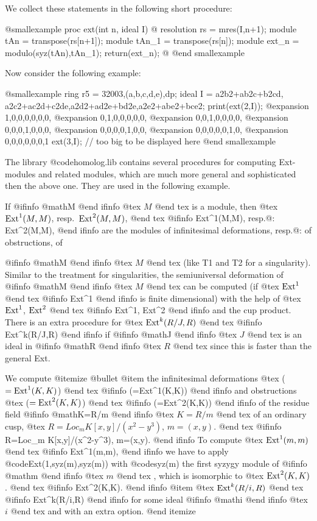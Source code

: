 We collect these statements in the following short procedure:

@smallexample
proc ext(int n, ideal I)
@{
  resolution rs = mres(I,n+1);
  module tAn    = transpose(rs[n+1]);
  module tAn_1  = transpose(rs[n]);
  module ext_n  = modulo(syz(tAn),tAn_1);
  return(ext_n);
@}
@end smallexample

Now consider the following example:

@smallexample
ring r5 = 32003,(a,b,c,d,e),dp;
ideal I = a2b2+ab2c+b2cd, a2c2+ac2d+c2de,a2d2+ad2e+bd2e,a2e2+abe2+bce2;
print(ext(2,I));
@expansion{} 1,0,0,0,0,0,0,
@expansion{} 0,1,0,0,0,0,0,
@expansion{} 0,0,1,0,0,0,0,
@expansion{} 0,0,0,1,0,0,0,
@expansion{} 0,0,0,0,1,0,0,
@expansion{} 0,0,0,0,0,1,0,
@expansion{} 0,0,0,0,0,0,1
ext(3,I);   // too big to be displayed here
@end smallexample

The library @code{homolog.lib} contains several procedures for computing
Ext-modules and related modules, which are much more general and
sophisticated then the above one. They are used in the following
example.

If 
@ifinfo
@math{M}
@end ifinfo
@tex
$M$
@end tex
 is a module, then
@tex
$\hbox{Ext}^1(M,M)$, resp.\ $\hbox{Ext}^2(M,M)$,
@end tex
@ifinfo
Ext^1(M,M), resp.@: Ext^2(M,M),
@end ifinfo
are the modules of infinitesimal deformations, resp.@: of obstructions, of

@ifinfo
@math{M}
@end ifinfo
@tex
$M$
@end tex
 (like T1 and T2 for a singularity).  Similar to the treatment
for singularities, the semiuniversal deformation of 
@ifinfo
@math{M}
@end ifinfo
@tex
$M$
@end tex
 can be
computed (if
@tex
$\hbox{Ext}^1$
@end tex
@ifinfo
Ext^1
@end ifinfo
is finite dimensional) with the help of
@tex
$\hbox{Ext}^1$, $\hbox{Ext}^2$
@end tex
@ifinfo
Ext^1, Ext^2
@end ifinfo
and the cup product. There is an extra procedure for
@tex
$\hbox{Ext}^k(R/J,R)$
@end tex
@ifinfo
Ext^k(R/J,R)
@end ifinfo
if 
@ifinfo
@math{J}
@end ifinfo
@tex
$J$
@end tex
 is an ideal in 
@ifinfo
@math{R}
@end ifinfo
@tex
$R$
@end tex
 since this is faster than the
general Ext.

We compute
@itemize @bullet
@item
the infinitesimal deformations
@tex
($=\hbox{Ext}^1(K,K)$)
@end tex
@ifinfo
(=Ext^1(K,K))
@end ifinfo
and obstructions
@tex
($=\hbox{Ext}^2(K,K)$)
@end tex
@ifinfo
(=Ext^2(K,K))
@end ifinfo
of the residue field 
@ifinfo
@math{K=R/m}
@end ifinfo
@tex
$K=R/m$
@end tex
 of an ordinary cusp,
@tex
$R=Loc_m K[x,y]/(x^2-y^3)$, $m=(x,y)$.
@end tex
@ifinfo
R=Loc_m K[x,y]/(x^2-y^3), m=(x,y).
@end ifinfo
To compute
@tex
$\hbox{Ext}^1(m,m)$
@end tex
@ifinfo
Ext^1(m,m),
@end ifinfo
we have to apply @code{Ext(1,syz(m),syz(m))} with
@code{syz(m)} the first syzygy module of 
@ifinfo
@math{m}
@end ifinfo
@tex
$m$
@end tex
, which is isomorphic to
@tex
$\hbox{Ext}^2(K,K)$.
@end tex
@ifinfo
Ext^2(K,K).
@end ifinfo
@item
@tex
$\hbox{Ext}^k(R/i,R)$
@end tex
@ifinfo
Ext^k(R/i,R)
@end ifinfo
for some ideal 
@ifinfo
@math{i}
@end ifinfo
@tex
$i$
@end tex
 and with an extra option.
@end itemize

